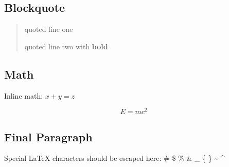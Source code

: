 \documentclass{article}
\begin{document}
\subsection{ Blockquote}

\begin{quote}
 quoted line one

 quoted line two with \textbf{bold}

\end{quote}

\subsection{ Math}

Inline math: $x + y = z$

\[
E = mc^2
\]

\subsection{ Final Paragraph}

Special LaTeX characters should be escaped here: \# \$ \% \& \_ \{ \} \~{} \^{}
\end{document}
